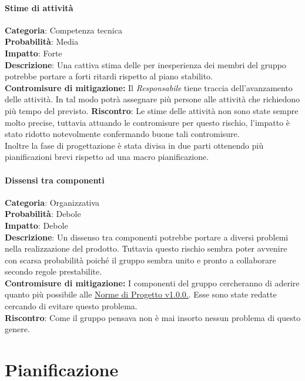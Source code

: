 \documentclass{scalatekids-article}
\begin{document}
\paragraph{Stime di attività}
\textbf{Categoria}: Competenza tecnica\\
\textbf{Probabilità}: Media\\
\textbf{Impatto}: Forte\\
\textbf{Descrizione}: Una cattiva stima delle  per inesperienza dei membri del gruppo potrebbe portare a forti ritardi rispetto al piano stabilito.\\
\textbf{Contromisure di mitigazione:} Il \textit{Responsabile} tiene traccia dell'avanzamento delle attività. In tal modo potrà assegnare più persone alle attività che richiedono più tempo del previsto.
\textbf{Riscontro}:
Le stime delle attività non sono state sempre molto precise, tuttavia attuando le contromisure per questo rischio, l'impatto è stato ridotto notevolmente confermando buone tali contromisure.\\ Inoltre la fase di progettazione è stata divisa in due parti ottenendo più pianificazioni brevi rispetto ad una macro pianificazione.
\paragraph{Dissensi tra componenti}
\textbf{Categoria}: Organizzativa\\
\textbf{Probabilità}: Debole\\
\textbf{Impatto}: Debole\\
\textbf{Descrizione}: Un dissenso tra componenti potrebbe portare a diversi problemi nella realizzazione del prodotto. Tuttavia questo rischio sembra poter avvenire con scarsa probabilità poiché il gruppo sembra unito e pronto a collaborare secondo regole prestabilite.\\
\textbf{Contromisure di mitigazione:} I componenti del gruppo cercheranno di aderire quanto più possibile alle \href{run:../Interni/NormeDiProgetto\_v1.0.0.pdf}{Norme di Progetto v1.0.0.}. Esse sono state redatte cercando di evitare questo problema.\\
\textbf{Riscontro}: Come il gruppo pensava non è mai insorto nessun problema di questo genere.\\

\section{Pianificazione}
\end{document}
